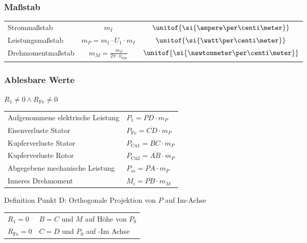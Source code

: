 \begin{sectionbox}
\subsubsection{Maßstab}
\begin{symbolbox}
\begin{tabular}{p{2.8cm}cc}
Strommaßstab & $m_I$ & $\unitof{\si{\ampere\per\centi\meter}}$\\
Leistungsmaßstab & $m_P = m_1\cdot U_1\cdot m_I$ & $\unitof{\si{\watt\per\centi\meter}}$\\
Drehmomentmaßstab & $m_M = \frac{m_P}{2\pi\cdot n_\text{syn}}$ & $\unitof{\si{\newtonmeter\per\centi\meter}}$
\end{tabular}
\end{symbolbox}

\subsubsection{Ablesbare Werte}
\begin{emphbox}
  $R_1\neq 0\wedge R_\text{Fe}\neq 0$
\end{emphbox}
\begin{tabular}{p{4cm}l}
Aufgenommene elektrische Leistung & $P_1 = \overline{PD}\cdot m_P$\\
Eisenverluste Stator & $P_\text{Fe} = \overline{CD}\cdot m_P$\\
Kupferverluste Stator & $P_{\text{Cu}1} = \overline{BC}\cdot m_P$\\
Kupferverluste Rotor & $P_{\text{Cu}2} = \overline{AB}\cdot m_P$\\
Abgegebene mechanische Leistung & $P_m = \overline{PA}\cdot m_P$\\
Inneres Drehmoment & $M_i = \overline{PB}\cdot m_M$
\end{tabular}
\begin{symbolbox}
  Definition Punkt D: Orthogonale Projektion von $P$ auf Im-Achse\\
  \begin{tabularx}{\columnwidth}{lX}
  $R_1 = 0$ & $B = C$ und $M$ auf Höhe von $P_0$\\
  $R_\text{Fe} = 0$ & $C = D$ und $P_0$ auf -Im Achse
  \end{tabularx}
\end{symbolbox}


\end{sectionbox}

